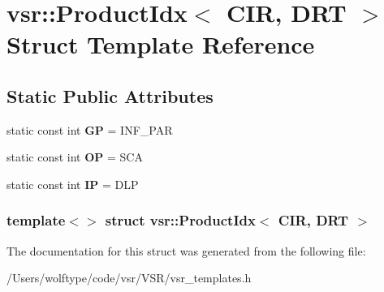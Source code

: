 \hypertarget{structvsr_1_1_product_idx_3_01_c_i_r_00_01_d_r_t_01_4}{\section{vsr\-:\-:Product\-Idx$<$ C\-I\-R, D\-R\-T $>$ Struct Template Reference}
\label{structvsr_1_1_product_idx_3_01_c_i_r_00_01_d_r_t_01_4}
}
\subsection*{Static Public Attributes}
\begin{DoxyCompactItemize}
\item 
\hypertarget{structvsr_1_1_product_idx_3_01_c_i_r_00_01_d_r_t_01_4_a81505bfe1817bb351cfd6bf2d99ec19a}{static const int {\bfseries G\-P} = I\-N\-F\-\_\-\-P\-A\-R}\label{structvsr_1_1_product_idx_3_01_c_i_r_00_01_d_r_t_01_4_a81505bfe1817bb351cfd6bf2d99ec19a}

\item 
\hypertarget{structvsr_1_1_product_idx_3_01_c_i_r_00_01_d_r_t_01_4_a9934132c22b16c7009d06eb4b2e55cae}{static const int {\bfseries O\-P} = S\-C\-A}\label{structvsr_1_1_product_idx_3_01_c_i_r_00_01_d_r_t_01_4_a9934132c22b16c7009d06eb4b2e55cae}

\item 
\hypertarget{structvsr_1_1_product_idx_3_01_c_i_r_00_01_d_r_t_01_4_ace8f7354bfd77b75adb5c07d5c865104}{static const int {\bfseries I\-P} = D\-L\-P}\label{structvsr_1_1_product_idx_3_01_c_i_r_00_01_d_r_t_01_4_ace8f7354bfd77b75adb5c07d5c865104}

\end{DoxyCompactItemize}
\subsubsection*{template$<$$>$ struct vsr\-::\-Product\-Idx$<$ C\-I\-R, D\-R\-T $>$}



The documentation for this struct was generated from the following file\-:\begin{DoxyCompactItemize}
\item 
/\-Users/wolftype/code/vsr/\-V\-S\-R/vsr\-\_\-templates.\-h\end{DoxyCompactItemize}
